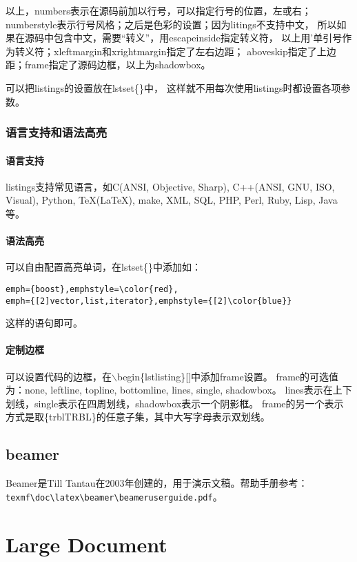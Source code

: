 \documentclass[a4paper,11pt,oneside,openany]{book}
\begin{document}
\begin{CJK*}{GBK}{song}
以上，numbers表示在源码前加以行号，可以指定行号的位置，左或右；
numberstyle表示行号风格；之后是色彩的设置；因为litings不支持中文，
所以如果在源码中包含中文，需要“转义”，用escapeinside指定转义符，
以上用'单引号作为转义符；xleftmargin和xrightmargin指定了左右边距；
aboveskip指定了上边距；frame指定了源码边框，以上为shadowbox。

可以把listings的设置放在lstset\{\}中，
这样就不用每次使用listings时都设置各项参数。

\subsubsection{语言支持和语法高亮}
\paragraph{语言支持}
listings支持常见语言，如C(ANSI, Objective, Sharp), 
    C++(ANSI, GNU, ISO, Visual), Python, \TeX(\LaTeX), 
    make, XML, SQL,
    PHP, Perl, Ruby, Lisp, Java等。

\paragraph{语法高亮}
可以自由配置高亮单词，在lstset\{\}中添加如：
\begin{lstlisting}
emph={boost},emphstyle=\color{red},
emph={[2]vector,list,iterator},emphstyle={[2]\color{blue}}
\end{lstlisting}
这样的语句即可。

\paragraph{定制边框}
可以设置代码的边框，在$\backslash$begin\{lstlisting\}[]中添加frame设置。
frame的可选值为：none, leftline, topline, bottomline, lines, single, shadowbox。
lines表示在上下划线，single表示在四周划线，shadowbox表示一个阴影框。
frame的另一个表示方式是取\{trblTRBL\}的任意子集，其中大写字母表示双划线。

\subsection{beamer}
Beamer是Till Tantau在2003年创建的，用于演示文稿。帮助手册参考：
\verb|texmf\doc\latex\beamer\beameruserguide.pdf|。


\newpage
\section{Large Document}

\end{CJK*}
\end{document}
